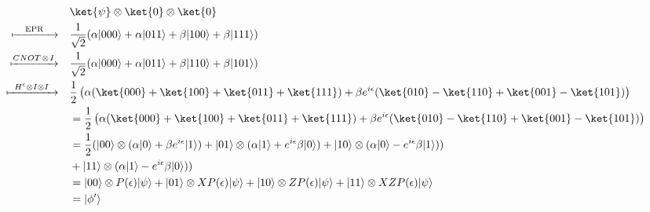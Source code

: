 \begin{equation}
  \begin{split}
    &  \ket{\psi} \otimes \ket{0} \otimes  \ket{0} \\
    \xmapsto{ \hspace{10pt} \text{EPR} \hspace{10pt} } \quad &  \frac{1}{\sqrt{2}} (\alpha|000\rangle + \alpha|011\rangle + \beta|100\rangle + \beta|111\rangle)\\
    \xmapsto{ CNOT \hspace{1pt} \otimes \hspace{1pt} I } \quad &  \frac{1}{\sqrt{2}} (\alpha|000\rangle + \alpha|011\rangle + \beta|110\rangle + \beta|101\rangle)\\ 
    \xmapsto[]{\hspace{5pt} H^{\epsilon} \otimes I \otimes I \hspace{5pt}} \quad &  \frac{1}{2}  \left(\alpha  (\ket{000}+\ket{100}+\ket{011}+\ket{111}) + \beta e^{i\epsilon} (\ket{010}-\ket{110}+\ket{001}-\ket{101}) \right) \\
    \quad & = \frac{1}{2}  \left(\alpha  (\ket{000}+\ket{100}+\ket{011}+\ket{111}) + \beta e^{i\epsilon} (\ket{010}-\ket{110}+\ket{001}-\ket{101}) \right)  \\
    \quad & = \frac{1}{2} (|00\rangle \otimes (\alpha |0\rangle + \beta e^{i\epsilon}|1\rangle ) + |01\rangle \otimes (\alpha |1\rangle + e^{i\epsilon} \beta|0\rangle) + |10\rangle \otimes (\alpha |0\rangle - e^{i\epsilon}\beta|1\rangle ))\\
  & + |11\rangle \otimes (\alpha |1\rangle - e^{i\epsilon} \beta|0\rangle))\\
   \quad & = |00\rangle \otimes  P(\epsilon) |\psi\rangle  + |01\rangle \otimes X P(\epsilon)|\psi\rangle + |10\rangle \otimes Z  P(\epsilon) |\psi\rangle + |11\rangle \otimes XZ P(\epsilon) |\psi\rangle\\
   & = |\phi'\rangle  \\
  \end{split}
\end{equation}


